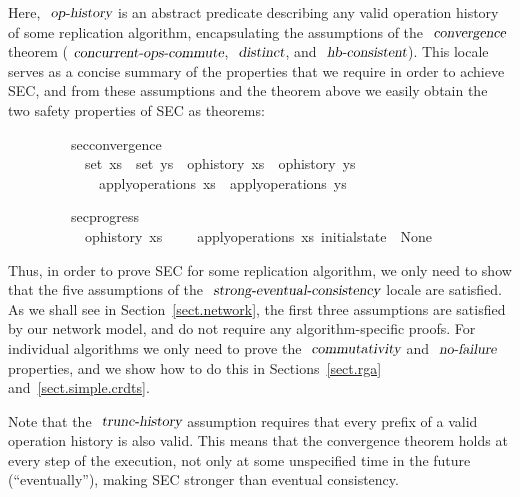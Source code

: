 \vspace{0.35em}
\noindent Here, $\isa{op-history}$ is an abstract predicate describing any valid operation history of some replication algorithm, encapsulating the assumptions of the $\isa{convergence}$ theorem ($\isa{concurrent-ops-commute}$, $\isa{distinct}$, and $\isa{hb-consistent}$).
This locale serves as a concise summary of the properties that we require in order to achieve SEC, and from these assumptions and the theorem above we easily obtain the two safety properties of SEC as theorems:
\vspace{0.35em}
\begin{isabellebody}
\ \ \ \ \ \ \ \ \ sec{\isacharunderscore}convergence{\isacharcolon}\isanewline
\ \ \ \ \ \ \ \ \ \ \ {\isachardoublequoteopen}set\ xs\ {\isacharequal}\ set\ ys{\isachardoublequoteclose}\ \ {\isachardoublequoteopen}op{\isacharunderscore}history\ xs{\isachardoublequoteclose}\ \ {\isachardoublequoteopen}op{\isacharunderscore}history\ ys{\isachardoublequoteclose}\isanewline
\ \ \ \ \ \ \ \ \ \ \ \ \ {\isachardoublequoteopen}apply{\isacharunderscore}operations\ xs\ {\isacharequal}\ apply{\isacharunderscore}operations\ ys{\isachardoublequoteclose}
\end{isabellebody}
\vspace{0.35em}
\begin{isabellebody}
\ \ \ \ \ \ \ \ \ sec{\isacharunderscore}progress{\isacharcolon}\isanewline
\ \ \ \ \ \ \ \ \ \ \ {\isachardoublequoteopen}op{\isacharunderscore}history\ xs{\isachardoublequoteclose}\ \ \ \ \ {\isachardoublequoteopen}apply{\isacharunderscore}operations\ xs\ initial{\isacharunderscore}state\ {\isasymnoteq}\ None{\isachardoublequoteclose}
\end{isabellebody}
\vspace{0.35em}

Thus, in order to prove SEC for some replication algorithm, we only need to show that the five assumptions of the $\isa{strong-eventual-consistency}$ locale are satisfied.
As we shall see in Section~\ref{sect.network}, the first three assumptions are satisfied by our network model, and do not require any algorithm-specific proofs.
For individual algorithms we only need to prove the $\isa{commutativity}$ and $\isa{no-failure}$ properties, and we show how to do this in Sections~\ref{sect.rga} and~\ref{sect.simple.crdts}.

Note that the $\isa{trunc-history}$ assumption requires that every prefix of a valid operation history is also valid.
This means that the convergence theorem holds at every step of the execution, not only at some unspecified time in the future (``eventually''), making SEC stronger than eventual consistency.
